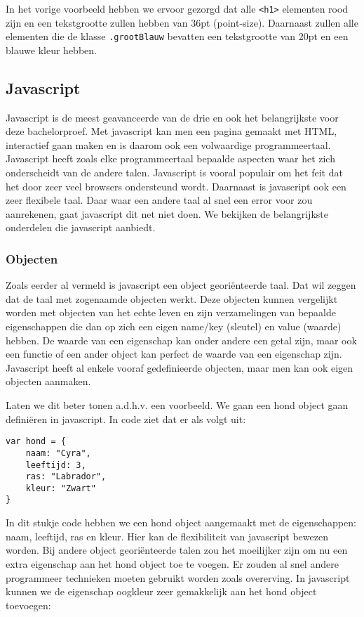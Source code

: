 In het vorige voorbeeld hebben we ervoor gezorgd dat alle \lstinline[basicstyle=\ttfamily\color{red}]|<h1>| elementen rood zijn en een tekstgrootte zullen hebben van 36pt (point-size). Daarnaast zullen alle elementen die de klasse \lstinline[basicstyle=\ttfamily\color{red}]|.grootBlauw| bevatten een tekstgrootte van 20pt en een blauwe kleur hebben.

\subsection{Javascript}
\label{subsec:Web VR}
Javascript is de meest geavanceerde van de drie en ook het belangrijkste voor deze bachelorproef. Met javascript kan men een pagina gemaakt met HTML, interactief gaan maken en is daarom ook een volwaardige programmeertaal. Javascript heeft zoals elke programmeertaal bepaalde aspecten waar het zich onderscheidt van de andere talen. Javascript is vooral populair om het feit dat het door zeer veel browsers ondersteund wordt. Daarnaast is javascript ook een zeer flexibele taal. Daar waar een andere taal al snel een error voor zou aanrekenen, gaat javascript dit net niet doen. We bekijken de belangrijkste onderdelen die javascript aanbiedt.

\subsubsection{Objecten}
\label{sssec:objecten}
Zoals eerder al vermeld is javascript een object georiënteerde taal. Dat wil zeggen dat de taal met zogenaamde objecten werkt. Deze objecten kunnen vergelijkt worden met objecten van het echte leven en zijn verzamelingen van bepaalde eigenschappen die dan op zich een eigen name/key (sleutel) en value (waarde) hebben. De waarde van een eigenschap kan onder andere een getal zijn, maar ook een functie of een ander object kan perfect de waarde van een eigenschap zijn. Javascript heeft al enkele vooraf gedefinieerde objecten, maar men kan ook eigen objecten aanmaken.

Laten we dit beter tonen a.d.h.v. een voorbeeld. We gaan een hond object gaan definiëren in javascript. In code ziet dat er als volgt uit:

\begin{lstlisting}[frame=single, caption=Hond object aanmaken]
var hond = {
	naam: "Cyra",
	leeftijd: 3,
	ras: "Labrador",
	kleur: "Zwart"
}
\end{lstlisting}

In dit stukje code hebben we een hond object aangemaakt met de eigenschappen: naam, leeftijd, ras en kleur. Hier kan de flexibiliteit van javascript bewezen worden. Bij andere object georiënteerde talen zou het moeilijker zijn om nu een extra eigenschap aan het hond object toe te voegen. Er zouden al snel andere programmeer technieken moeten gebruikt worden zoals overerving. In javascript kunnen we de eigenschap oogkleur zeer gemakkelijk aan het hond object toevoegen:

